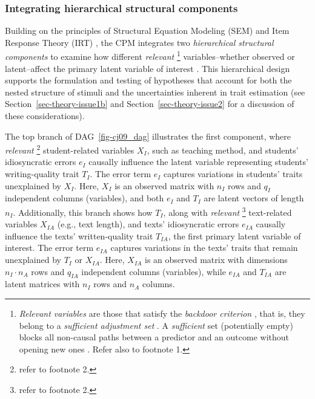 \documentclass[
  authoryear,
  review,
  1p]{elsarticle}
\begin{document}
\subsubsection{Integrating hierarchical structural
components}\label{sec-theory-theoretical_P3}

Building on the principles of Structural Equation Modeling (SEM)
\citep{Hoyle_et_al_2023} and Item Response Theory (IRT)
\citep{Fox_2010, vanderLinden_et_al_2017_I}, the CPM integrates two
\emph{hierarchical structural components} to examine how different
\emph{relevant} \footnote{\emph{Relevant variables} are those that
  satisfy the \emph{backdoor criterion} \citep[pp 37]{Neal_2020}, that
  is, they belong to a \emph{sufficient adjustment set}
  \citep{Pearl_2009, Pearl_et_al_2016, Morgan_et_al_2014}. A
  \emph{sufficient} set (potentially empty) blocks all non-causal paths
  between a predictor and an outcome without opening new ones
  \citep{Pearl_2009}. Refer also to footnote 1.} variables--whether
observed or latent--affect the primary latent variable of interest
\citep{Everitt_et_al_2010}. This hierarchical design supports the
formulation and testing of hypotheses that account for both the nested
structure of stimuli and the uncertainties inherent in trait estimation
(see Section~\ref{sec-theory-issue1b} and
Section~\ref{sec-theory-issue2} for a discussion of these
considerations).

The top branch of DAG~\ref{fig-cj09_dag} illustrates the first
component, where \emph{relevant} \footnote{refer to footnote 2.}
student-related variables \(X_{I}\), such as teaching method, and
students' idiosyncratic errors \(e_{I}\) causally influence the latent
variable representing students' writing-quality trait \(T_{I}\). The
error term \(e_{I}\) captures variations in students' traits unexplained
by \(X_{I}\). Here, \(X_{I}\) is an observed matrix with \(n_{I}\) rows
and \(q_{I}\) independent columns (variables), and both \(e_{I}\) and
\(T_{I}\) are latent vectors of length \(n_{I}\). Additionally, this
branch shows how \(T_{I}\), along with \emph{relevant} \footnote{refer
  to footnote 2.} text-related variables \(X_{IA}\) (e.g., text length),
and texts' idiosyncratic errors \(e_{IA}\) causally influence the texts'
written-quality trait \(T_{IA}\), the first primary latent variable of
interest. The error term \(e_{IA}\) captures variations in the texts'
traits that remain unexplained by \(T_{I}\) or \(X_{IA}\). Here,
\(X_{IA}\) is an observed matrix with dimensions \(n_{I} \cdot n_{A}\)
rows and \(q_{IA}\) independent columns (variables), while \(e_{IA}\)
and \(T_{IA}\) are latent matrices with \(n_{I}\) rows and \(n_{A}\)
columns.
\end{document}
